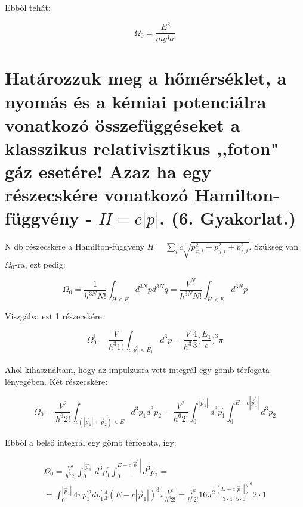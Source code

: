 \documentclass[a4paper,12pt]{article}
\begin{document}
\par Ebből tehát:

\begin{equation}
\Omega_{0} = \frac{E^{2}}{mghc}
\end{equation}

\section{Határozzuk meg a hőmérséklet, a nyomás és a kémiai potenciálra vonatkozó összefüggéseket a klasszikus relativisztikus ,,foton" gáz esetére! Azaz ha egy részecskére vonatkozó Hamilton-függvény - $H = c|p|$. (6. Gyakorlat.)}

\par N db részecskére a Hamilton-függvény $H = \sum_{i}c\sqrt{p_{x,i}^{2} + p_{y,i}^{2} + p_{z, i}^{2}}$. Szükség van $\Omega_{0}$-ra, ezt pedig:

\begin{equation*}
\Omega_{0} = \frac{1}{h^{3N}N!}\int_{H < E} d^{3N}p d^{3N}q = \frac{V^{N}}{h^{3N}N!}\int_{H < E} d^{3N}p 
\end{equation*}

\par Viszgálva ezt 1 részecskére:

\begin{equation*}
\Omega_{0}^{1} = \frac{V}{h^{3}1!}\int_{c|\vec{p}| < E_{1}} d^{3}p = \frac{V}{h^{3}}\frac{4}{3}\Big(\frac{E_{1}}{c}\Big)^{3}\pi
\end{equation*}

\par Ahol kihasználtam, hogy az impulzusra vett integrál egy gömb térfogata lényegében. Két részecskére:

\begin{equation*}
\Omega_{0} = \frac{V^{2}}{h^{6}2!}\int_{c(|\vec{p}_{1}| + \vec{p}_{2}) < E} d^{3}p_{1}d^{3}p_{2} = \frac{V^{2}}{h^{6}2!} \int_{0}^{ |\vec{p}_{1}| }d^{3}p_{1}^{'}\int_{0}^{E - c|\vec{p}_{1}^{'}|}d^{3}p_{2}
\end{equation*}

\par Ebből a belső integrál egy gömb térfogata, így:

\begin{equation*}
\begin{gathered}
\Omega_{0} = \frac{V^{2}}{h^{6}2!} \int_{0}^{ |\vec{p}_{1}| }d^{3}p_{1}^{'}\int_{0}^{E - c|\vec{p}_{1}^{'}|}d^{3}p_{2} = \\
= \int_{0}^{|\vec{p}_{1}|}4\pi p_{1}^{'2}dp_{1}^{'}\frac{4}{3}(E - c|\vec{p}_{1}|)^{3}\pi \frac{V^{2}}{h^{6}2!} = \frac{V^{2}}{h^{6}2!} 16\pi^{2} \frac{(E - c|\vec{p}_{1}|)^{6}}{3\cdot4\cdot5\cdot6}2\cdot1
\end{gathered}
\end{equation*}
\end{document}
